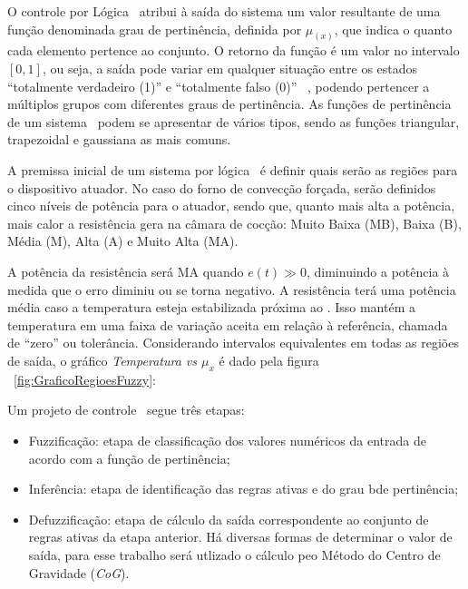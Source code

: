 O controle por Lógica \Fuzzy \ atribui à saída do sistema um valor resultante de uma função denominada grau de pertinência, definida por $\mu_{(x)}$, que indica o quanto cada elemento pertence ao conjunto. O retorno da função é um valor no intervalo $[0,1]$, ou seja, a saída pode variar em qualquer situação entre os estados “totalmente verdadeiro (1)” e “totalmente falso (0)” \ \cite{LivroFuzzy}, podendo pertencer a múltiplos grupos com diferentes graus de pertinência. As funções de pertinência de um sistema \Fuzzy \ podem se apresentar de vários tipos, sendo as funções triangular, trapezoidal e gaussiana as mais comuns.

A premissa inicial de um sistema por lógica \Fuzzy \ é definir quais serão as regiões para o dispositivo atuador. No caso do forno de convecção forçada, serão definidos cinco níveis de potência para o atuador, sendo que, quanto mais alta a potência, mais calor a resistência gera na câmara de cocção: Muito Baixa (MB), Baixa (B), Média (M), Alta (A) e Muito Alta (MA). 

A potência da resistência será MA quando $e(t) \gg 0$, diminuindo a potência à medida que o erro diminiu ou se torna negativo. A resistência terá uma potência média caso a temperatura esteja estabilizada próxima ao \SetPoint. Isso mantém a temperatura em uma faixa de variação aceita em relação à referência, chamada de “zero” ou tolerância. Considerando intervalos equivalentes em todas as regiões de saída, o gráfico \textit{Temperatura vs $\mu _ {x}$} é dado pela figura ~\ref{fig:GraficoRegioesFuzzy}:

Um projeto de controle \Fuzzy \ segue três etapas:

\begin{itemize}
    \item Fuzzificação: etapa de classificação dos valores numéricos da entrada de acordo com a função de pertinência;
    \item Inferência: etapa de identificação das regras ativas e do grau bde pertinência;
    \item Defuzzificação: etapa de cálculo da saída correspondente ao conjunto de regras ativas da etapa anterior. Há diversas formas de determinar o valor de saída, para esse trabalho será utlizado o cálculo peo Método do Centro de Gravidade (\textit{CoG}).
\end{itemize}
